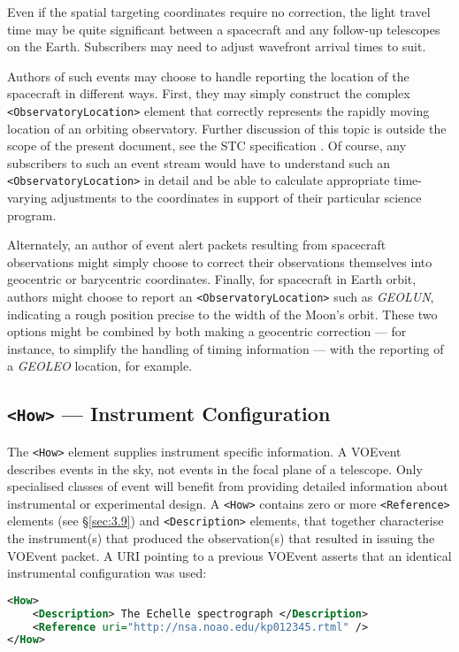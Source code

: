 \documentclass[11pt,a4paper]{ivoa}
\begin{document}
Even if the spatial targeting coordinates require no correction, the light
travel time may be quite significant between a spacecraft and any follow-up
telescopes on the Earth. Subscribers may need to adjust wavefront arrival times
to suit.

Authors of such events may choose to handle reporting the location of the
spacecraft in different ways. First, they may simply construct the
complex \verb|<ObservatoryLocation>| element that correctly represents the rapidly moving
location of an orbiting observatory. Further discussion of this topic is outside
the scope of the present document, see the STC specification
\citep{2007ivoa.spec.1030R}. Of course, any subscribers to such an event stream
would have to understand such an \verb|<ObservatoryLocation>| in detail and be
able to calculate appropriate time-varying adjustments to the coordinates in
support of their particular science program.

Alternately, an author of event alert packets resulting from spacecraft
observations might simply choose to correct their observations themselves into
geocentric or barycentric coordinates. Finally, for spacecraft in Earth orbit,
authors might choose to report an \verb|<ObservatoryLocation>| such as
\emph{GEOLUN}, indicating a rough position precise to the width of the Moon's
orbit. These two options might be combined by both making a geocentric
correction --- for instance, to simplify the handling of timing information ---
with the reporting of a \emph{GEOLEO} location, for example.

\subsection{\texttt{<How>} --- Instrument Configuration}
\label{sec:3.5}
The \verb|<How>| element supplies instrument specific information. A VOEvent
describes events in the sky, not events in the focal plane of a telescope. Only
specialised classes of event will benefit from providing detailed information
about instrumental or experimental design. A \verb|<How>| contains zero or more
\verb|<Reference>| elements (see \S\ref{sec:3.9}) and \verb|<Description>|
elements, that together characterise the instrument(s) that produced the
observation(s) that resulted in issuing the VOEvent packet. A URI pointing to a
previous VOEvent asserts that an identical instrumental configuration was used:
\begin{lstlisting}[language=XML]
<How>
    <Description> The Echelle spectrograph </Description>
    <Reference uri="http://nsa.noao.edu/kp012345.rtml" />
</How>
\end{lstlisting}
\end{document}
